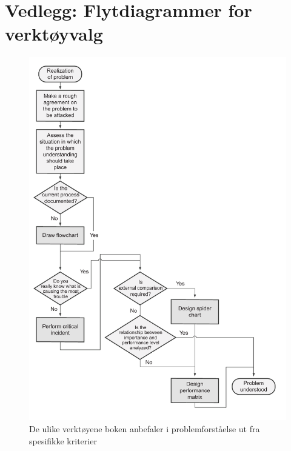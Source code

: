 \chapter{Vedlegg: Flytdiagrammer for verktøyvalg}
\label{flytdiagrammer-verktoyvalg}

\begin{figure}[H]
    \centering
    \includegraphics[scale=0.35]{main/bilder/verktoyvalg/verktoyvalg_problemforstaelse.pdf}
    \caption[Verktøyvalg for problemforståelse]{De ulike verktøyene boken anbefaler i problemforståelse ut fra spesifikke kriterier}
    \label{fig:verktoyvalg-problemforstaelse}
\end{figure}

